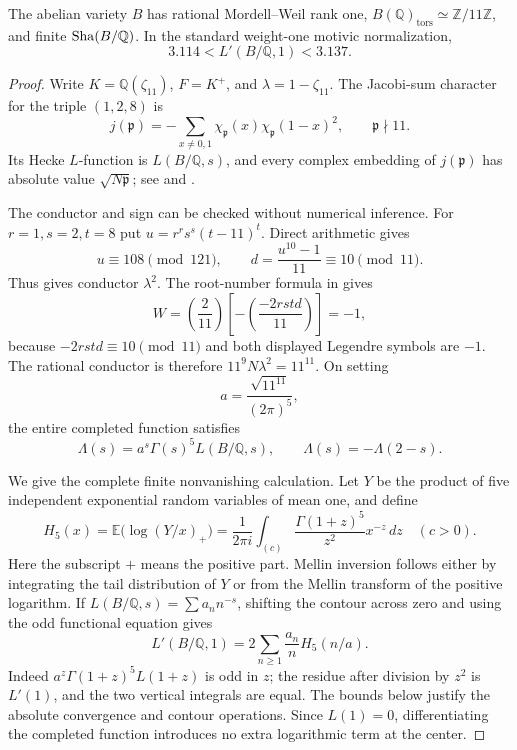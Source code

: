 \begin{proposition}
\label{prop:eleven-rankone-arithmetic}
The abelian variety $B$ has rational Mordell--Weil rank one,
$B(\mathbb Q)_{\mathrm{tors}}\simeq\mathbb Z/11\mathbb Z$, and finite
$\operatorname{Sha}(B/\mathbb Q)$.  In the standard weight-one motivic normalization,
\[
 3.114<L'(B/\mathbb Q,1)<3.137.
\]
\end{proposition}
\begin{proof}
Write $K=\mathbb Q(\zeta_{11})$, $F=K^+$, and
$\lambda=1-\zeta_{11}$.  The Jacobi-sum character for the triple
$(1,2,8)$ is
\[
 j(\mathfrak p)=-\sum_{x\ne0,1}
       \chi_{\mathfrak p}(x)\chi_{\mathfrak p}(1-x)^2,
 \qquad\mathfrak p\nmid11.
\]
Its Hecke $L$-function is $L(B/\mathbb Q,s)$, and every complex
embedding of $j(\mathfrak p)$ has absolute value
$\sqrt{N\mathfrak p}$; see \citet[\S1, pp.~202--203]{GrossRohrlich1978}
and \citet[\S\S2.1--2.2, author pp.~5--6]{ShuExpanded2021}.

The conductor and sign can be checked without numerical inference.
For $r=1,s=2,t=8$ put $u=r^rs^s(t-11)^t$.  Direct arithmetic gives
\[
 u\equiv108\pmod{121},\qquad
 d=\frac{u^{10}-1}{11}\equiv10\pmod{11}.
\]
Thus \citet[Proposition~3.12(2), author p.~16]{ShuExpanded2021}
gives conductor $\lambda^2$.  The root-number formula in
\citet[Theorem~3.13, author pp.~17--18]{ShuExpanded2021} gives
\[
 W=\left(\frac2{11}\right)
       \left[-\left(\frac{-2rstd}{11}\right)\right]=-1,
\]
because $-2rstd\equiv10\pmod{11}$ and both displayed Legendre
symbols are $-1$.  The rational conductor is therefore
$11^9 N\lambda^2=11^{11}$.  On setting
\[
 a=\frac{\sqrt{11^{11}}}{(2\pi)^5},
\]
the entire completed function satisfies
\[
 \Lambda(s)=a^s\Gamma(s)^5L(B/\mathbb Q,s),\qquad
 \Lambda(s)=-\Lambda(2-s).
\]

We give the complete finite nonvanishing calculation.  Let $Y$ be the
product of five independent exponential random variables of mean one,
and define
\[
 H_5(x)=\mathbb E\bigl(\log(Y/x)_+\bigr)
       =\frac1{2\pi i}\int_{(c)}
          \frac{\Gamma(1+z)^5}{z^2}x^{-z}\,dz\quad(c>0).
\]
Here the subscript $+$ means the positive part.  Mellin inversion
follows either by integrating the tail distribution of $Y$ or from
the Mellin transform of the positive logarithm.  If
$L(B/\mathbb Q,s)=\sum a_n n^{-s}$, shifting the contour across
zero and using the odd functional equation gives
\[
 L'(B/\mathbb Q,1)
       =2\sum_{n\ge1}\frac{a_n}{n}H_5(n/a).
\]
Indeed $a^z\Gamma(1+z)^5L(1+z)$ is odd in $z$; the residue after
division by $z^2$ is $L'(1)$, and the two vertical integrals are
equal.  The bounds below justify the absolute convergence and
contour operations.  Since $L(1)=0$, differentiating the completed
function introduces no extra logarithmic term at the center.


\end{proof}

